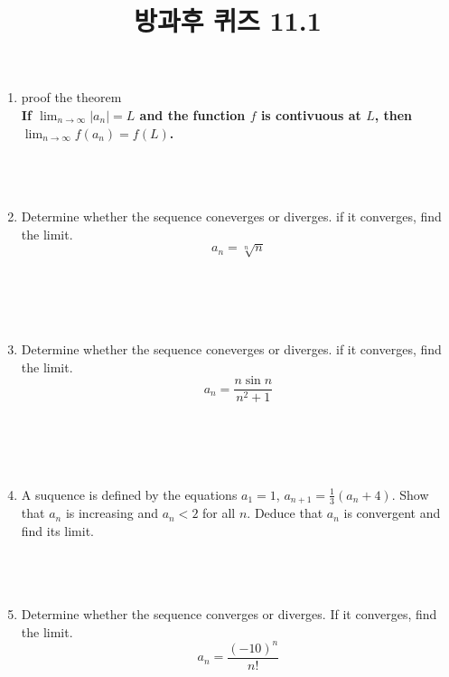 \documentclass[12pt, a4paper]{article}
\title{방과후 퀴즈 11.1}
\author{}
\date{}
\begin{document}
\maketitle
\begin{enumerate}
    \item proof the theorem \\ \textbf{If \( \lim_{n\to\infty} |a_n| = L \) and the function \(f\) is contivuous at \(L\), then \( \lim_{n\to\infty} f(a_n) = f(L) \).} \\ \\ \\ \\

    \item Determine whether the sequence coneverges or diverges. if it converges, find the limit.
    \[ a_n = \sqrt[n]{n} \] \\ \\ \\ \\
    
    \item Determine whether the sequence coneverges or diverges. if it converges, find the limit.
    \[ a_n = \dfrac{n\sin n}{n^2+1} \] \\ \\ \\ \\ 

    \item A suquence is defined by the equations \(a_1=1\), \(a_{n+1}=\frac{1}{3}(a_n+4)\). Show that {\(a_n\)} is increasing and \(a_n<2\) for all \(n\). Deduce that {\(a_n\)} is convergent and find its limit. \\ \\ \\ \\ 
    
    \item Determine whether the sequence converges or diverges. If it converges, find the limit.
    \[ a_n = \frac{(-10)^n}{n!} \] 

\end{enumerate}
\end{document}
